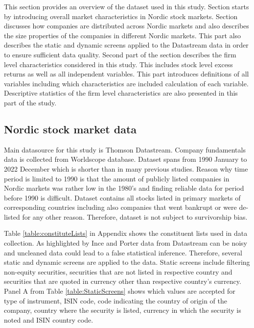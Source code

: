 \documentclass{article}
\begin{document}
This section provides an overview of the dataset used in this study. Section starts by introducing overall market characteristics in Nordic stock markets. Section discusses how companies are distributed across Nordic markets and also describes the size properties of the companies in different Nordic markets. This part also describes the static and dynamic screens applied to the Datastream data in order to ensure sufficient data quality. Second part of the section describes the firm level characteristics considered in this study. This includes stock level excess returns as well as all independent variables. This part introduces definitions of all variables including which characteristics are included calculation of each variable. Descriptive statistics of the firm level characteristics are also presented in this part of the study. \par

\subsection{Nordic stock market data}\label{NordicStockMarketData}

Main datasource for this study is Thomson Datastream. Company fundamentals data is collected from Worldscope database. Dataset spans from 1990 January to 2022 December which is shorter than in many previous studies. Reason why time period is limited to 1990 is that the amount of publicly listed companies in Nordic markets was rather low in the 1980's and finding reliable data for period before 1990 is difficult. Dataset contains all stocks listed in primary markets of corresponding countries including also companies that went bankrupt or were de-listed for any other reason. Therefore, dataset is not subject to survivorship bias. \par

Table \ref{table:constituteLists} in Appendix shows the constituent lists used in data collection. As highlighted by Ince and Porter \citeyear{Ince2006} data from Datastream can be noisy and uncleaned data could lead to a false statistical inference. Therefore, several static and dynamic screens are applied to the data. Static screens include filtering non-equity securities, securities that are not listed in respective country and securities that are quoted in currency other than respective country's currency. Panel A from Table \ref{table:StaticScreens} shows which values are accepted for type of instrument, ISIN code, code indicating the country of origin of the company, country where the security is listed, currency in which the security is noted and ISIN country code. \par
\end{document}
